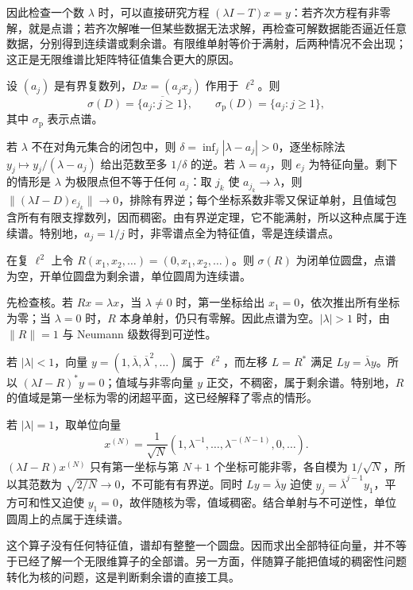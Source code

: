 \documentclass[UTF8,12pt,a4paper,fontset=fandol]{ctexbook}
\begin{document}
因此检查一个数 $\lambda$ 时，可以直接研究方程 $(\lambda I-T)x=y$：若齐次方程有非零解，就是点谱；若齐次解唯一但某些数据无法求解，再检查可解数据能否逼近任意数据，分别得到连续谱或剩余谱。有限维单射等价于满射，后两种情况不会出现；这正是无限维谱比矩阵特征值集合更大的原因。

\begin{example}[对角算子的谱逐项可算]\label{ex:fa-diagonal-spectrum}
设 $(a_j)$ 是有界复数列，$Dx=(a_jx_j)$ 作用于 $\ell^2$。则
\[
 \sigma(D)=\overline{\{a_j:j\geq1\}},\qquad
 \sigma_{\mathrm p}(D)=\{a_j:j\geq1\},
\]
其中 $\sigma_{\mathrm p}$ 表示点谱。
\end{example}
\begin{solve}
若 $\lambda$ 不在对角元集合的闭包中，则 $\delta=\inf_j|\lambda-a_j|>0$，逐坐标除法 $y_j\mapsto y_j/(\lambda-a_j)$ 给出范数至多 $1/\delta$ 的逆。若 $\lambda=a_j$，则 $e_j$ 为特征向量。剩下的情形是 $\lambda$ 为极限点但不等于任何 $a_j$：取 $j_k$ 使 $a_{j_k}\to\lambda$，则 $\|(\lambda I-D)e_{j_k}\|\to0$，排除有界逆；每个坐标系数非零又保证单射，且值域包含所有有限支撑数列，因而稠密。由有界逆定理，它不能满射，所以这种点属于连续谱。特别地，$a_j=1/j$ 时，非零谱点全为特征值，零是连续谱点。
\end{solve}

\begin{example}[右移算子的剩余谱]\label{ex:fa-shift-spectrum}
在复 $\ell^2$ 上令 $R(x_1,x_2,\ldots)=(0,x_1,x_2,\ldots)$。则 $\sigma(R)$ 为闭单位圆盘，点谱为空，开单位圆盘为剩余谱，单位圆周为连续谱。
\end{example}
\begin{solve}
先检查核。若 $Rx=\lambda x$，当 $\lambda\ne0$ 时，第一坐标给出 $x_1=0$，依次推出所有坐标为零；当 $\lambda=0$ 时，$R$ 本身单射，仍只有零解。因此点谱为空。$|\lambda|>1$ 时，由 $\|R\|=1$ 与 Neumann 级数得到可逆性。

若 $|\lambda|<1$，向量 $y=(1,\overline\lambda,\overline\lambda^2,\ldots)$ 属于 $\ell^2$，而左移 $L=R^*$ 满足 $Ly=\overline\lambda y$。所以 $(\lambda I-R)^*y=0$；值域与非零向量 $y$ 正交，不稠密，属于剩余谱。特别地，$R$ 的值域是第一坐标为零的闭超平面，这已经解释了零点的情形。

若 $|\lambda|=1$，取单位向量
\[
 x^{(N)}=\frac1{\sqrt N}(1,\lambda^{-1},\ldots,\lambda^{-(N-1)},0,\ldots).
\]
$ (\lambda I-R)x^{(N)}$ 只有第一坐标与第 $N+1$ 个坐标可能非零，各自模为 $1/\sqrt N$，所以其范数为 $\sqrt{2/N}\to0$，不可能有有界逆。同时 $Ly=\overline\lambda y$ 迫使 $y_j=\overline\lambda^{j-1}y_1$，平方可和性又迫使 $y_1=0$，故伴随核为零，值域稠密。结合单射与不可逆性，单位圆周上的点属于连续谱。
\end{solve}
这个算子没有任何特征值，谱却有整整一个圆盘。因而求出全部特征向量，并不等于已经了解一个无限维算子的全部谱。另一方面，伴随算子能把值域的稠密性问题转化为核的问题，这是判断剩余谱的直接工具。
\end{document}
